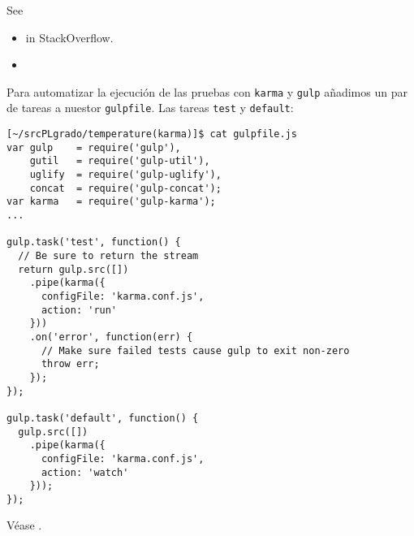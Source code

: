 See 
\begin{itemize}
\item
{} in StackOverflow.
\item
{}
\end{itemize}


Para automatizar la ejecución de las pruebas con \verb|karma| y \verb|gulp|
añadimos un par de tareas a nuestor \verb|gulpfile|. Las tareas \verb|test| y
\verb|default|:

\begin{verbatim}
[~/srcPLgrado/temperature(karma)]$ cat gulpfile.js 
var gulp    = require('gulp'),
    gutil   = require('gulp-util'),
    uglify  = require('gulp-uglify'),
    concat  = require('gulp-concat');
var karma   = require('gulp-karma');
...

gulp.task('test', function() {
  // Be sure to return the stream
  return gulp.src([])
    .pipe(karma({
      configFile: 'karma.conf.js',
      action: 'run'
    }))
    .on('error', function(err) {
      // Make sure failed tests cause gulp to exit non-zero
      throw err;
    });
});

gulp.task('default', function() {
  gulp.src([])
    .pipe(karma({
      configFile: 'karma.conf.js',
      action: 'watch'
    }));
});
\end{verbatim}


Véase
.


